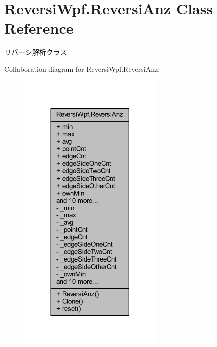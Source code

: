 \hypertarget{class_reversi_wpf_1_1_reversi_anz}{}\section{Reversi\+Wpf.\+Reversi\+Anz Class Reference}
\label{class_reversi_wpf_1_1_reversi_anz}


リバーシ解析クラス  




Collaboration diagram for Reversi\+Wpf.\+Reversi\+Anz\+:
\nopagebreak
\begin{figure}[H]
\begin{center}
\leavevmode
\includegraphics[width=197pt]{class_reversi_wpf_1_1_reversi_anz__coll__graph}
\end{center}
\end{figure}

